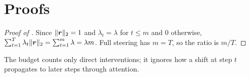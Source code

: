 \section{Proofs}\label{app:proofs}

\begin{proof}[Proof of ]
Since $\|\boldsymbol{r}\|_2 = 1$ and $\lambda_t = \lambda$ for $t \le m$ and $0$ otherwise, $\sum_{t=1}^{T} \lambda_t \|\boldsymbol{r}\|_2 = \sum_{t=1}^{m} \lambda = \lambda m$. Full steering has $m = T$, so the ratio is $m/T$.
\end{proof}

\begin{remark}
The budget counts only direct interventions; it ignores how a shift at step $t$ propagates to later steps through attention.
\end{remark}
